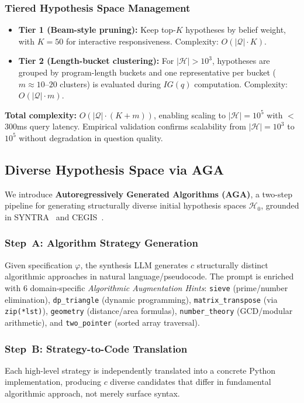 \documentclass[10pt,conference]{IEEEtran}
\begin{document}
\subsubsection{Tiered Hypothesis Space Management}
\begin{itemize}
  \item \textbf{Tier 1 (Beam-style pruning):} Keep top-$K$ hypotheses by belief weight, with $K = 50$ for interactive responsiveness. Complexity: $O(|\mathcal{Q}| \cdot K)$.
  \item \textbf{Tier 2 (Length-bucket clustering):} For $|\mathcal{H}| > 10^3$, hypotheses are grouped by program-length buckets and one representative per bucket ($m \approx 10$--$20$ clusters) is evaluated during $IG(q)$ computation. Complexity: $O(|\mathcal{Q}| \cdot m)$.
\end{itemize}
\textbf{Total complexity:} $O(|\mathcal{Q}| \cdot (K + m))$, enabling scaling to $|\mathcal{H}| = 10^5$ with $<$300ms query latency. Empirical validation confirms scalability from $|\mathcal{H}| = 10^3$ to $10^5$ without degradation in question quality.

\subsection{Diverse Hypothesis Space via AGA}\label{sec:method:aga}

We introduce \textbf{Autoregressively Generated Algorithms (AGA)}, a two-step pipeline for generating structurally diverse initial hypothesis spaces $\mathcal{H}_0$, grounded in SYNTRA~\cite{syntra} and CEGIS~\cite{cegis}.

\subsubsection{Step~A: Algorithm Strategy Generation}
Given specification $\varphi$, the synthesis LLM generates $c$ structurally distinct algorithmic approaches in natural language/pseudocode. The prompt is enriched with 6 domain-specific \textit{Algorithmic Augmentation Hints}: \texttt{sieve} (prime/number elimination), \texttt{dp\_triangle} (dynamic programming), \texttt{matrix\_transpose} (via \texttt{zip(*lst)}), \texttt{geometry} (distance/area formulas), \texttt{number\_theory} (GCD/modular arithmetic), and \texttt{two\_pointer} (sorted array traversal).

\subsubsection{Step~B: Strategy-to-Code Translation}
Each high-level strategy is independently translated into a concrete Python implementation, producing $c$ diverse candidates that differ in fundamental algorithmic approach, not merely surface syntax.
\end{document}
